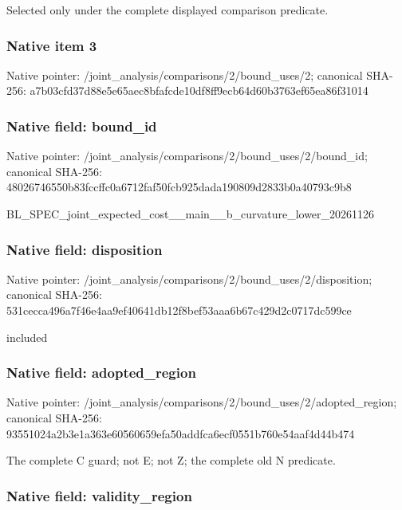 \documentclass[10pt,a4paper]{article}
\begin{document}
Selected only under the complete displayed comparison predicate.


\subsubsection{Native item 3}


Native pointer: /joint\_analysis/comparis\allowbreak{}ons/2/bound\_uses/2; canonical SHA-256: a7b03cfd37d88e5e65aec8bf\allowbreak{}afcde10df8ff9ecb64d60b37\allowbreak{}63ef65ea86f31014



\subsubsection{Native field: bound\_id}


Native pointer: /joint\_analysis/comparis\allowbreak{}ons/2/bound\_uses/2/bound\allowbreak{}\_id; canonical SHA-256: 48026746550b83fccffc0a67\allowbreak{}12faf50fcb925dada190809d\allowbreak{}2833b0a40793c9b8


BL\_SPEC\_joint\_expected\_c\allowbreak{}ost\_\_main\_\_b\_curvature\_l\allowbreak{}ower\_20261126


\subsubsection{Native field: disposition}


Native pointer: /joint\_analysis/comparis\allowbreak{}ons/2/bound\_uses/2/dispo\allowbreak{}sition; canonical SHA-256: 531cecca496a7f46e4aa9ef4\allowbreak{}0641db12f8bef53aaa6b67c4\allowbreak{}29d2c0717dc599ce


included


\subsubsection{Native field: adopted\_region}


Native pointer: /joint\_analysis/comparis\allowbreak{}ons/2/bound\_uses/2/adopt\allowbreak{}ed\_region; canonical SHA-256: 93551024a2b3e1a363e60560\allowbreak{}659efa50addfca6ecf0551b7\allowbreak{}60e54aaf4d44b474


The complete C guard; not E; not Z; the complete old N predicate.


\subsubsection{Native field: validity\_region}
\end{document}
